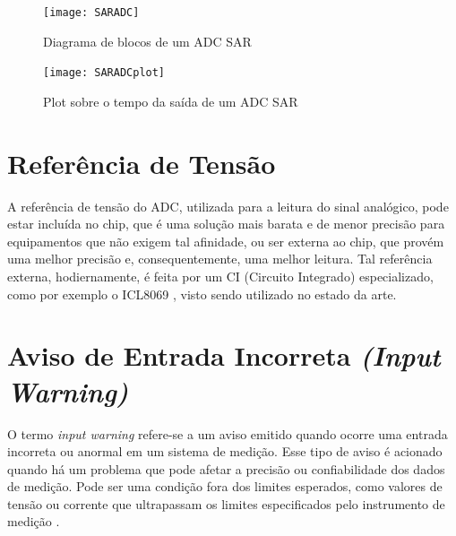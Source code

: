 \begin{figure}[htb!]%
    \caption{Diagrama de blocos de um ADC SAR}%
    \label{fig:SARADC}%
    \texttt{[image: SARADC]}%
\end{figure}

\begin{figure}[htb!]%
    \caption{Plot sobre o tempo da saída de um ADC SAR}%
    \label{fig:SARADCplot}%
    \texttt{[image: SARADCplot]}%
\end{figure}

\section{Referência de Tensão}\label{sec:VoltageReference}

A referência de tensão do ADC, utilizada para a leitura do sinal analógico, pode estar incluída no chip, que é uma solução mais barata e de menor precisão para equipamentos que não exigem tal afinidade, ou ser externa ao chip, que provém uma melhor precisão e, consequentemente, uma melhor leitura. Tal referência externa, hodiernamente, é feita por um \gls{CI} (Circuito Integrado) especializado, como por exemplo o ICL8069 \cite{icl8069}, visto sendo utilizado no estado da arte. %

\section{Aviso de Entrada Incorreta \textit{(Input Warning)}}\label{sec:inpWarning}

O termo \textit{input warning} refere-se a um aviso emitido quando ocorre uma entrada incorreta ou anormal em um sistema de medição. Esse tipo de aviso é acionado quando há um problema que pode afetar a precisão ou confiabilidade dos dados de medição. Pode ser uma condição fora dos limites esperados, como valores de tensão ou corrente que ultrapassam os limites especificados pelo instrumento de medição \cite{base_alarms}.

